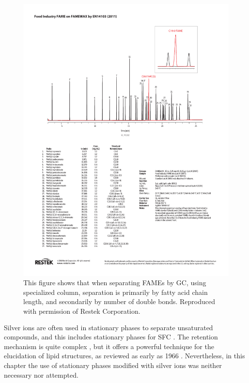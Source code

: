 \begin{figure}
\centering
\includegraphics[width=\textwidth]{Figures/GC_PC1332.pdf}
\decoRule

\caption[Separation of FAME by GC]{This figure shows that when separating FAMEs
by GC, using specialized column, separation is primarily by fatty acid chain
length, and secondarily by number of double bonds. Reproduced with permission of Restek Corporation.}

\label{fig:RestekFAMEsGC}
\end{figure}

Silver ions are often used in stationary phases to separate unsaturated
compounds, and this includes stationary phases for SFC \autocite{Sandra2002,
Potgieter2013}. The retention mechanism is quite complex
\autocite{Nikolova-Damyanova2019}, but it offers a powerful technique for the
elucidation of lipid structures, as reviewed as early as 1966
\autocite{Morris1966}. Nevertheless, in this chapter the use of stationary
phases modified with silver ions was neither necessary nor attempted.

